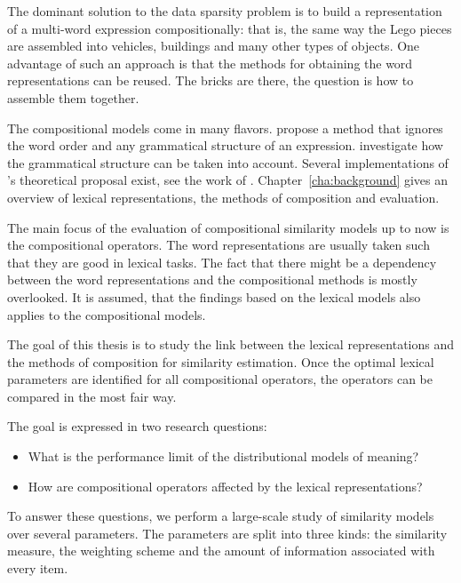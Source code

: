 The dominant solution to the data sparsity problem is to build a representation of a multi-word expression compositionally: that is, the same way the Lego pieces are assembled into vehicles, buildings and many other types of objects. One advantage of such an approach is that the methods for obtaining the word representations can be reused. The bricks are there, the question is how to assemble them together.

The compositional models come in many flavors. \citet{mitchell2010composition} propose a method that ignores the word order and any grammatical structure of an expression. \citet{DBLP:journals/corr/abs-1003-4394,baroni2014frege} investigate how the grammatical structure can be taken into account. Several implementations of \citet{DBLP:journals/corr/abs-1003-4394}'s theoretical proposal exist, see the work of \citet{Grefenstette:2011:ESC:2145432.2145580,Grefenstette:2011:ETV:2140490.2140497,kartsadrqpl2014,fried-polajnar-clark:2015:ACL-IJCNLP}. Chapter~\ref{cha:background} gives an overview of lexical representations, the methods of composition and evaluation.

The main focus of the evaluation of compositional similarity models up to now is the compositional operators. The word representations are usually taken such that they are good in lexical tasks. The fact that there might be a dependency between the word representations and the compositional methods is mostly overlooked. It is assumed, that the findings based on the lexical models also applies to the compositional models.

The goal of this thesis is to study the link between the lexical representations and the methods of composition for similarity estimation. Once the optimal lexical parameters are identified for all compositional operators, the operators can be compared in the most fair way.

The goal is expressed in two research questions:
\begin{itemize}
\item What is the performance limit of the distributional models of meaning?
\item How are compositional operators affected by the lexical representations?
\end{itemize}

To answer these questions, we perform a large-scale study of similarity models over several parameters. The parameters are split into three kinds: the similarity measure, the weighting scheme and the amount of information associated with every item. 

